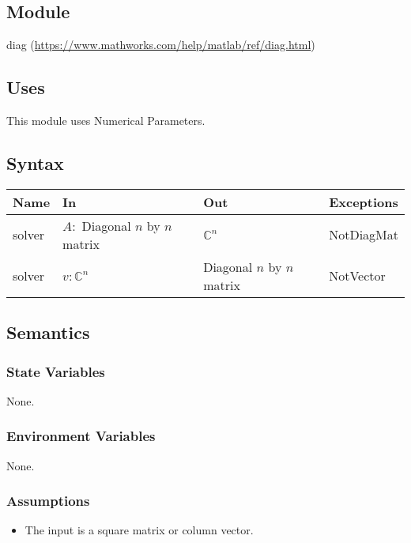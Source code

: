 \documentclass[12pt, titlepage]{article}
\begin{document}
\subsection{Module}

diag (\url{https://www.mathworks.com/help/matlab/ref/diag.html})

\subsection{Uses}

This module uses Numerical Parameters. 

\subsection{Syntax}

\begin{center}
	\begin{tabular}{p{2cm} p{6cm} p{6cm} p{3cm}}
		\hline
		\textbf{Name} & \textbf{In} & \textbf{Out} & \textbf{Exceptions} \\
		\hline
		solver & $A :$ Diagonal $n$ by $n$ matrix  & $\mathbb{C}^{n}$ & 
		NotDiagMat \\ 
		solver & $v :\mathbb{C}^{n}$  & Diagonal $n$ by $n$ matrix & 
		NotVector \\
		\hline
	\end{tabular}
\end{center}

\subsection{Semantics}

\subsubsection{State Variables}

None.

\subsubsection{Environment Variables}

None.

\subsubsection{Assumptions}

\begin{itemize}
	\item The input is a square matrix or column vector.  
\end{itemize}
\end{document}
